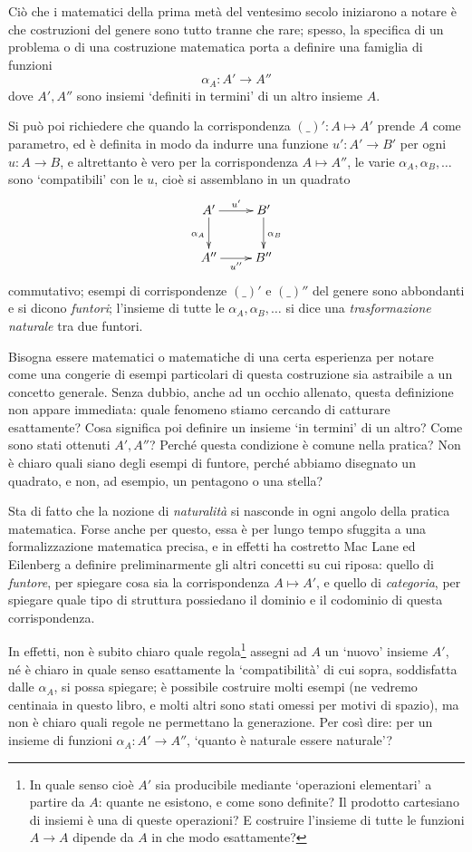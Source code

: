 Ciò che i matematici della prima metà del ventesimo secolo iniziarono a notare è che costruzioni del genere sono tutto tranne che rare; spesso, la specifica di un problema o di una costruzione matematica porta a definire una famiglia di funzioni
\[\alpha_A : A' \to A'' \]
dove \(A',A''\) sono insiemi `definiti in termini' di un altro insieme \(A\).

Si può poi richiedere che quando la corrispondenza \((\_)' : A\mapsto A'\) prende \(A\) come parametro, ed è definita in modo da indurre una funzione \(u' : A' \to B'\) per ogni \(u : A \to B\), e altrettanto è vero per la corrispondenza \(A\mapsto A''\), le varie \(\alpha_A, \alpha_B,\dots\) sono `compatibili' con le \(u\), cioè si assemblano in un quadrato%
\[
	\vcenter{\xymatrix{
			A'\ar[r]^{u'}\ar[d]_{\alpha_A} & B'\ar[d]^{\alpha_B} \\
			A'' \ar[r]_{u''} & B''
		}}
\]
commutativo; esempi di corrispondenze \((\_)'\) e \((\_)''\) del genere sono abbondanti e si dicono \emph{funtori}; l'insieme di tutte le \(\alpha_A,\alpha_B,\dots\) si dice una \emph{trasformazione naturale} tra due funtori.

Bisogna essere matematici o matematiche di una certa esperienza per notare come una congerie di esempi particolari di questa costruzione sia astraibile a un concetto generale. Senza dubbio, anche ad un occhio allenato, questa definizione non appare immediata: quale fenomeno stiamo cercando di catturare esattamente? Cosa significa poi definire un insieme `in termini' di un altro? Come sono stati ottenuti \(A',A''\)? Perché questa condizione è comune nella pratica? Non è chiaro quali siano degli esempi di funtore, perché abbiamo disegnato un quadrato, e non, ad esempio, un pentagono o una stella?

Sta di fatto che la nozione di \emph{naturalità} si nasconde in ogni angolo della pratica matematica. Forse anche per questo, essa è per lungo tempo sfuggita a una formalizzazione matematica precisa, e in effetti ha costretto Mac Lane ed Eilenberg a definire preliminarmente gli altri concetti su cui riposa: quello di \emph{funtore}, per spiegare cosa sia la corrispondenza \(A\mapsto A'\), e quello di \emph{categoria}, per spiegare quale tipo di struttura possiedano il dominio e il codominio di questa corrispondenza.

In effetti, non è subito chiaro quale regola\footnote{In quale senso cioè \(A'\) sia producibile mediante `operazioni elementari' a partire da \(A\): quante ne esistono, e come sono definite? Il prodotto cartesiano di insiemi è una di queste operazioni? E costruire l'insieme di tutte le funzioni \(A\to A\) dipende da \(A\) in che modo esattamente?} assegni ad \(A\) un `nuovo' insieme \(A'\), né è chiaro in quale senso esattamente la `compatibilità' di cui sopra, soddisfatta dalle \(\alpha_A\), si possa spiegare; è possibile costruire molti esempi (ne vedremo centinaia in questo libro, e molti altri sono stati omessi per motivi di spazio), ma non è chiaro quali regole ne permettano la generazione. Per così dire: per un insieme di funzioni \(\alpha_A : A' \to A''\), `quanto è naturale essere naturale'?

